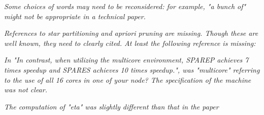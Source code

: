\emph{Some choices of words may need to be reconsidered: for example, "a bunch
of" might not be appropriate in a technical paper.}



\emph{References to star partitioning and apriori pruning are missing. Though these
are well known, they need to clearly cited. At least the following reference is
missing:}


\emph{In "In contrast, when utilizing the multicore
environment, SPAREP achieves 7 times speedup and SPARES achieves 10 times speedup.", was "multicore"
referring to the use of all 16 cores in one of your node? The specification of the machine was not clear.}



\emph{The computation of "eta" was slightly different than that in the paper}

